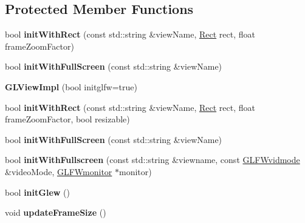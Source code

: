 \subsection*{Protected Member Functions}
\begin{DoxyCompactItemize}
\item 
\mbox{\label{classGLViewImpl_ad6cafe42af330824321180c50d5982c1}} 
bool {\bfseries init\+With\+Rect} (const std\+::string \&view\+Name, \hyperlink{classRect}{Rect} rect, float frame\+Zoom\+Factor)
\item 
\mbox{\label{classGLViewImpl_a2815df489e15eeb1e75d96398ff71c9c}} 
bool {\bfseries init\+With\+Full\+Screen} (const std\+::string \&view\+Name)
\item 
\mbox{\label{classGLViewImpl_a992936557b65a1ab4d3b47253ad5253b}} 
{\bfseries G\+L\+View\+Impl} (bool initglfw=true)
\item 
\mbox{\label{classGLViewImpl_ac70725a8b0fca28f099c73326ed6b701}} 
bool {\bfseries init\+With\+Rect} (const std\+::string \&view\+Name, \hyperlink{classRect}{Rect} rect, float frame\+Zoom\+Factor, bool resizable)
\item 
\mbox{\label{classGLViewImpl_a2815df489e15eeb1e75d96398ff71c9c}} 
bool {\bfseries init\+With\+Full\+Screen} (const std\+::string \&view\+Name)
\item 
\mbox{\label{classGLViewImpl_a36797ac9459603a20e54f0aa3b7ae649}} 
bool {\bfseries init\+With\+Fullscreen} (const std\+::string \&viewname, const \hyperlink{structGLFWvidmode}{G\+L\+F\+Wvidmode} \&video\+Mode, \hyperlink{group__monitor_ga8d9efd1cde9426692c73fe40437d0ae3}{G\+L\+F\+Wmonitor} $\ast$monitor)
\item 
\mbox{\label{classGLViewImpl_a67ec065afa82ee548b112e224edeb86d}} 
bool {\bfseries init\+Glew} ()
\item 
\mbox{\label{classGLViewImpl_aad55bf57b544d5ce5ee557820d8d2826}} 
void {\bfseries update\+Frame\+Size} ()
\item 
\mbox{\label{classGLViewImpl_aee71bf18f6c0c51dd1d8f65346df3e0b}} 

\end{DoxyCompactItemize}
